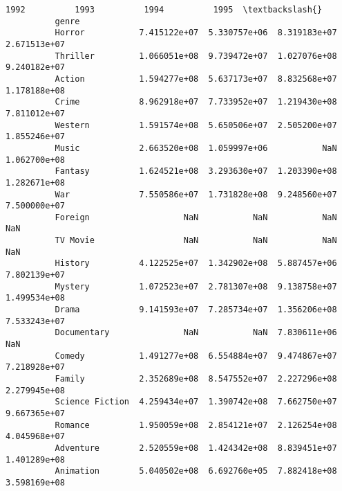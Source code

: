 \documentclass[11pt]{article}
\begin{document}
\begin{Verbatim}[commandchars=\\\{\}]
                                   1992          1993          1994          1995  \textbackslash{}
          genre                                                                     
          Horror           7.415122e+07  5.330757e+06  8.319183e+07  2.671513e+07   
          Thriller         1.066051e+08  9.739472e+07  1.027076e+08  9.240182e+07   
          Action           1.594277e+08  5.637173e+07  8.832568e+07  1.178188e+08   
          Crime            8.962918e+07  7.733952e+07  1.219430e+08  7.811012e+07   
          Western          1.591574e+08  5.650506e+07  2.505200e+07  1.855246e+07   
          Music            2.663520e+08  1.059997e+06           NaN  1.062700e+08   
          Fantasy          1.624521e+08  3.293630e+07  1.203390e+08  1.282671e+08   
          War              7.550586e+07  1.731828e+08  9.248560e+07  7.500000e+07   
          Foreign                   NaN           NaN           NaN           NaN   
          TV Movie                  NaN           NaN           NaN           NaN   
          History          4.122525e+07  1.342902e+08  5.887457e+06  7.802139e+07   
          Mystery          1.072523e+07  2.781307e+08  9.138758e+07  1.499534e+08   
          Drama            9.141593e+07  7.285734e+07  1.356206e+08  7.533243e+07   
          Documentary               NaN           NaN  7.830611e+06           NaN   
          Comedy           1.491277e+08  6.554884e+07  9.474867e+07  7.218928e+07   
          Family           2.352689e+08  8.547552e+07  2.227296e+08  2.279945e+08   
          Science Fiction  4.259434e+07  1.390742e+08  7.662750e+07  9.667365e+07   
          Romance          1.950059e+08  2.854121e+07  2.126254e+08  4.045968e+07   
          Adventure        2.520559e+08  1.424342e+08  8.839451e+07  1.401289e+08   
          Animation        5.040502e+08  6.692760e+05  7.882418e+08  3.598169e+08   
          

\end{Verbatim}
\end{document}
